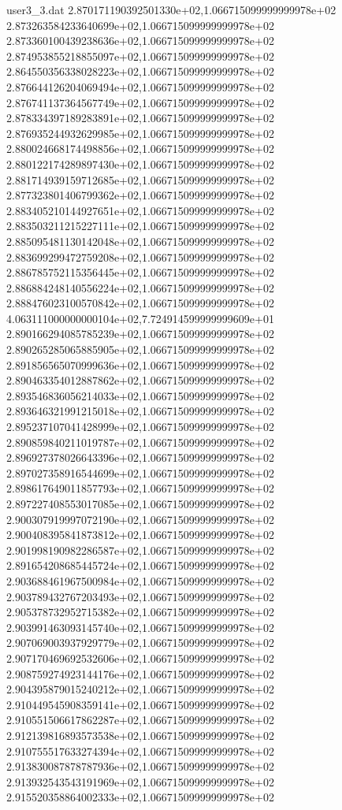\begin{filecontents}{user3_3.dat}
2.870171190392501330e+02,1.066715099999999978e+02
2.873263584233640699e+02,1.066715099999999978e+02
2.873360100439238636e+02,1.066715099999999978e+02
2.874953855218855097e+02,1.066715099999999978e+02
2.864550356338028223e+02,1.066715099999999978e+02
2.876644126204069494e+02,1.066715099999999978e+02
2.876741137364567749e+02,1.066715099999999978e+02
2.878334397189283891e+02,1.066715099999999978e+02
2.876935244932629985e+02,1.066715099999999978e+02
2.880024668174498856e+02,1.066715099999999978e+02
2.880122174289897430e+02,1.066715099999999978e+02
2.881714939159712685e+02,1.066715099999999978e+02
2.877323801406799362e+02,1.066715099999999978e+02
2.883405210144927651e+02,1.066715099999999978e+02
2.883503211215227111e+02,1.066715099999999978e+02
2.885095481130142048e+02,1.066715099999999978e+02
2.883699299472759208e+02,1.066715099999999978e+02
2.886785752115356445e+02,1.066715099999999978e+02
2.886884248140556224e+02,1.066715099999999978e+02
2.888476023100570842e+02,1.066715099999999978e+02
4.063111000000000104e+02,7.724914599999999609e+01
2.890166294085785239e+02,1.066715099999999978e+02
2.890265285065885905e+02,1.066715099999999978e+02
2.891856565070999636e+02,1.066715099999999978e+02
2.890463354012887862e+02,1.066715099999999978e+02
2.893546836056214033e+02,1.066715099999999978e+02
2.893646321991215018e+02,1.066715099999999978e+02
2.895237107041428999e+02,1.066715099999999978e+02
2.890859840211019787e+02,1.066715099999999978e+02
2.896927378026643396e+02,1.066715099999999978e+02
2.897027358916544699e+02,1.066715099999999978e+02
2.898617649011857793e+02,1.066715099999999978e+02
2.897227408553017085e+02,1.066715099999999978e+02
2.900307919997072190e+02,1.066715099999999978e+02
2.900408395841873812e+02,1.066715099999999978e+02
2.901998190982286587e+02,1.066715099999999978e+02
2.891654208685445724e+02,1.066715099999999978e+02
2.903688461967500984e+02,1.066715099999999978e+02
2.903789432767203493e+02,1.066715099999999978e+02
2.905378732952715382e+02,1.066715099999999978e+02
2.903991463093145740e+02,1.066715099999999978e+02
2.907069003937929779e+02,1.066715099999999978e+02
2.907170469692532606e+02,1.066715099999999978e+02
2.908759274923144176e+02,1.066715099999999978e+02
2.904395879015240212e+02,1.066715099999999978e+02
2.910449545908359141e+02,1.066715099999999978e+02
2.910551506617862287e+02,1.066715099999999978e+02
2.912139816893573538e+02,1.066715099999999978e+02
2.910755517633274394e+02,1.066715099999999978e+02
2.913830087878787936e+02,1.066715099999999978e+02
2.913932543543191969e+02,1.066715099999999978e+02
2.915520358864002333e+02,1.066715099999999978e+02

\end{filecontents}
